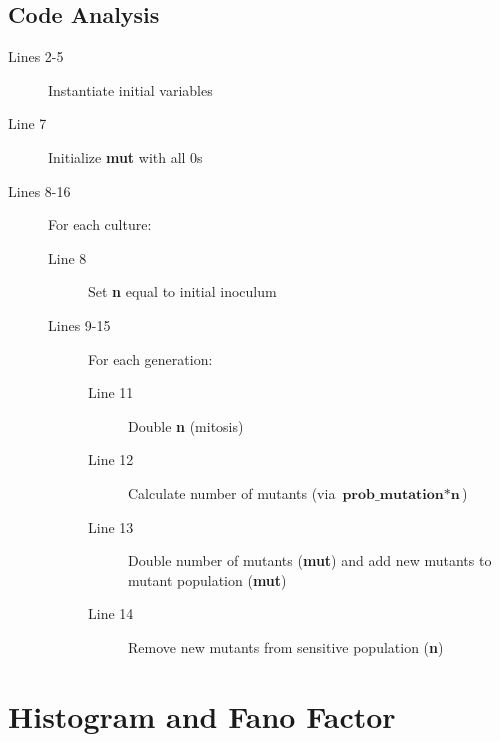 \documentclass[titlepage]{scrartcl}
\begin{document}
\subsection{Code Analysis}
\begin{description}
    \item[Lines 2-5] Instantiate initial variables
    \item[Line 7] Initialize \textbf{mut} with all 0s
    \item[Lines 8-16] For each culture:
    \begin{description}
        \item[Line 8] Set \textbf{n} equal to initial inoculum
        \item[Lines 9-15] For each generation:
        \begin{description}
            \item[Line 11] Double \textbf{n} (mitosis)
            \item[Line 12] Calculate number of mutants (via $\textbf{prob\_mutation}*\textbf{n}$)
            \item[Line 13] Double number of mutants (\textbf{mut}) and add new mutants to mutant population (\textbf{mut})
            \item[Line 14] Remove new mutants from sensitive population (\textbf{n})
        \end{description}
    \end{description}
\end{description}
\section{Histogram and Fano Factor}
\end{document}
